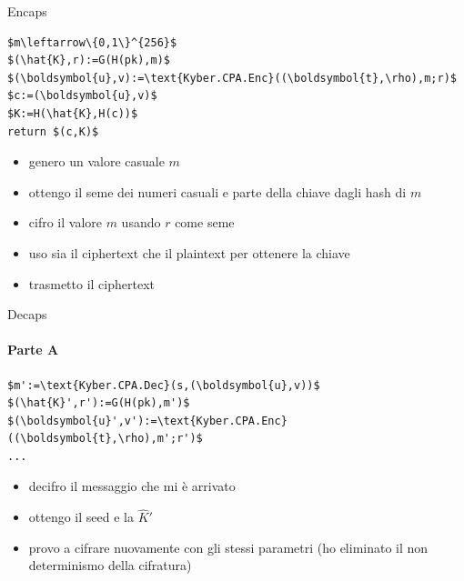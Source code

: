     \begin{frame}[fragile]{Encaps}
\begin{minipage}{0.45\linewidth}
    \begin{lstlisting}[title=Kyber.Encaps(pk):,mathescape=true]
$m\leftarrow\{0,1\}^{256}$
$(\hat{K},r):=G(H(pk),m)$
$(\boldsymbol{u},v):=\text{Kyber.CPA.Enc}((\boldsymbol{t},\rho),m;r)$
$c:=(\boldsymbol{u},v)$
$K:=H(\hat{K},H(c))$
return $(c,K)$
        \end{lstlisting}
    \end{minipage}\hfill
    \begin{minipage}{0.5\linewidth}
        \begin{itemize}%
            \item genero un valore casuale $m$
            \item ottengo il seme dei numeri casuali e parte della chiave dagli hash di $m$
            \item cifro il valore $m$ usando $r$ come seme
            \item uso sia il ciphertext che il plaintext per ottenere la chiave
            \item trasmetto il ciphertext            
        \end{itemize}
    \end{minipage}
    \end{frame}

        \begin{frame}[fragile]{Decaps}
            \framesubtitle{Parte A}
\begin{minipage}{0.45\linewidth}
    \begin{lstlisting}[title=Kyber.Decaps(sk\,z\,c):,mathescape=true]
$m':=\text{Kyber.CPA.Dec}(s,(\boldsymbol{u},v))$
$(\hat{K}',r'):=G(H(pk),m')$
$(\boldsymbol{u}',v'):=\text{Kyber.CPA.Enc}((\boldsymbol{t},\rho),m';r')$
...
        \end{lstlisting}
    \end{minipage}\hfill
    \begin{minipage}{0.5\linewidth}
        \begin{itemize}%
            \item decifro il messaggio che mi è arrivato
            \item ottengo il seed e la $\hat{K}'$
            \item provo a cifrare nuovamente con gli stessi parametri (ho eliminato il non determinismo della cifratura)
        \end{itemize}
    \end{minipage}
        \end{frame}

